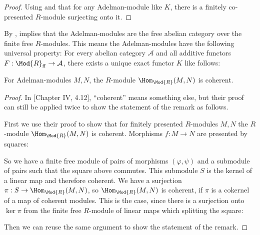 \begin{proof}
   Using  and that for any Adelman-module like $K$, there is a finitely co-presented $R$-module surjecting onto it. 
\end{proof}

\begin{remark}
  By \cite[Theorem 1.15]{adelman-construction},  implies that the Adelman-modules are the free abelian category over the finite free $R$-modules.
  This means the Adelman-modules have the following universal property:
  For every abelian category $\mathcal{A}$ and all additive functors $F:\Mod{R}_{\mathrm{ff}}\to \mathcal{A}$, there exists a unique exact functor $K$ like follows:
  \begin{center}
\end{center}
\end{remark}

\begin{remark}
  \label{hom-closure}
  For Adelman-modules $M,N$, the $R$-module $\Hom_{\Mod{R}}(M,N)$ is coherent.
\end{remark}

\begin{proof}
  In \cite{lombardi-quitte}[Chapter IV, 4.12], ``coherent'' means something else, but their proof can still be applied twice to show the statement of the remark as follows.
  
  First we use their proof to show that for finitely presented $R$-modules $M,N$ the $R$-module $\Hom_{\Mod{R}}(M,N)$ is coherent. Morphisms $f:M\to N$ are presented by squares:
  \begin{center}
\end{center}
  So we have a finite free module of pairs of morphisms $(\varphi,\psi)$ and a submodule of pairs such that the square above commutes.
  This submodule $S$ is the kernel of a linear map and therefore coherent.
  We have a surjection $\pi:S\to \Hom_{\Mod{R}}(M,N)$, so $\Hom_{\Mod{R}}(M,N)$ is coherent,
  if $\pi$ is a cokernel of a map of coherent modules.
  This is the case, since there is a surjection onto $\ker{\pi}$ from the finite free $R$-module of linear maps which splitting the square:
  \begin{center}
\end{center}
  Then we can reuse the same argument to show the statement of the remark.
\end{proof}

